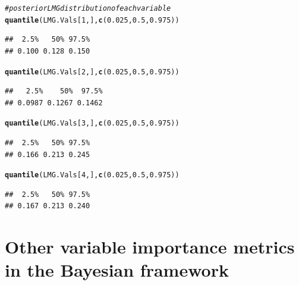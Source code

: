 \documentclass[11pt,a4paper,twoside]{book}\usepackage[]{graphicx}\usepackage[]{color}
\makeatletter
\newcommand{\hlnum}[1]{\textcolor[rgb]{0.686,0.059,0.569}{#1}}%
\newcommand{\hlcom}[1]{\textcolor[rgb]{0.678,0.584,0.686}{\textit{#1}}}%
\newcommand{\hlstd}[1]{\textcolor[rgb]{0.345,0.345,0.345}{#1}}%
\newcommand{\hlkwd}[1]{\textcolor[rgb]{0.737,0.353,0.396}{\textbf{#1}}}%
\newenvironment{kframe}{%
 \def\at@end@of@kframe{}%
 \ifinner\ifhmode%
  \def\at@end@of@kframe{\end{minipage}}%
  \begin{minipage}{\columnwidth}%
 \fi\fi%
 \def\FrameCommand##1{\hskip\@totalleftmargin \hskip-\fboxsep
 \colorbox{shadecolor}{##1}\hskip-\fboxsep
     \hskip-\linewidth \hskip-\@totalleftmargin \hskip\columnwidth}%
 \MakeFramed {\advance\hsize-\width
   \@totalleftmargin\z@ \linewidth\hsize
   \@setminipage}}%
 {\par\unskip\endMakeFramed%
 \at@end@of@kframe}
\newenvironment{knitrout}{}{} %
\makeatother
\begin{document}
\begin{knitrout}
\begin{kframe}
\begin{alltt}
\hlcom{# posterior LMG distribution of each variable}
\hlkwd{quantile}\hlstd{(LMG.Vals[}\hlnum{1}\hlstd{,],} \hlkwd{c}\hlstd{(}\hlnum{0.025}\hlstd{,} \hlnum{0.5}\hlstd{,} \hlnum{0.975}\hlstd{))}
\end{alltt}
\begin{verbatim}
##  2.5%   50% 97.5% 
## 0.100 0.128 0.150
\end{verbatim}
\begin{alltt}
\hlkwd{quantile}\hlstd{(LMG.Vals[}\hlnum{2}\hlstd{,],} \hlkwd{c}\hlstd{(}\hlnum{0.025}\hlstd{,} \hlnum{0.5}\hlstd{,} \hlnum{0.975}\hlstd{))}
\end{alltt}
\begin{verbatim}
##   2.5%    50%  97.5% 
## 0.0987 0.1267 0.1462
\end{verbatim}
\begin{alltt}
\hlkwd{quantile}\hlstd{(LMG.Vals[}\hlnum{3}\hlstd{,],} \hlkwd{c}\hlstd{(}\hlnum{0.025}\hlstd{,} \hlnum{0.5}\hlstd{,} \hlnum{0.975}\hlstd{))}
\end{alltt}
\begin{verbatim}
##  2.5%   50% 97.5% 
## 0.166 0.213 0.245
\end{verbatim}
\begin{alltt}
\hlkwd{quantile}\hlstd{(LMG.Vals[}\hlnum{4}\hlstd{,],} \hlkwd{c}\hlstd{(}\hlnum{0.025}\hlstd{,} \hlnum{0.5}\hlstd{,} \hlnum{0.975}\hlstd{))}
\end{alltt}
\begin{verbatim}
##  2.5%   50% 97.5% 
## 0.167 0.213 0.240
\end{verbatim}
\end{kframe}
\end{knitrout}















\chapter{Other variable importance metrics in the Bayesian framework}
\end{document}
